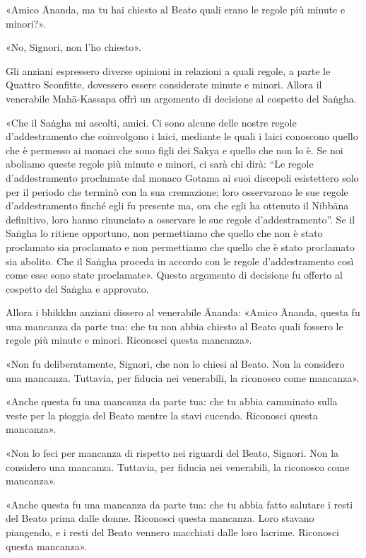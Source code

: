 «Amico Ānanda, ma tu hai chiesto al Beato quali erano le regole più
minute e minori?».


«No, Signori, non l’ho chiesto».


 Gli anziani espressero diverse opinioni in relazioni
a quali regole, a parte le Quattro Sconfitte, dovessero essere
considerate minute e minori. Allora il venerabile Mahā-Kassapa offrì un
argomento di decisione al cospetto del Saṅgha.


 «Che il Saṅgha mi ascolti, amici. Ci sono alcune delle
nostre regole d’addestramento che coinvolgono i laici, mediante le quali
i laici conoscono quello che è permesso ai monaci che sono figli dei
Sakya e quello che non lo è. Se noi aboliamo queste regole più minute e
minori, ci sarà chi dirà: “Le regole d’addestramento proclamate dal
monaco Gotama ai suoi discepoli esistettero solo per il periodo che
terminò con la sua cremazione; loro osservarono le sue regole
d’addestramento finché egli fu presente ma, ora che egli ha ottenuto il
Nibbāna definitivo, loro hanno rinunciato a osservare le sue regole
d’addestramento”. Se il Saṅgha lo ritiene opportuno, non permettiamo che
quello che non è stato proclamato sia proclamato e non permettiamo che
quello che è stato proclamato sia abolito. Che il Saṅgha proceda in
accordo con le regole d’addestramento così come esse sono state
proclamate». Questo argomento di decisione fu offerto al cospetto del
Saṅgha e approvato.


Allora i bhikkhu anziani dissero al venerabile Ānanda: «Amico Ānanda,
questa fu una mancanza da parte tua: che tu non abbia chiesto al Beato
quali fossero le regole più minute e minori. Riconosci questa mancanza».


«Non fu deliberatamente, Signori, che non lo chiesi al Beato. Non la
considero una mancanza. Tuttavia, per fiducia nei venerabili, la
riconosco come mancanza».


«Anche questa fu una mancanza da parte tua: che tu abbia camminato sulla
veste per la pioggia del Beato mentre la stavi cucendo. Riconosci questa
mancanza».


«Non lo feci per mancanza di rispetto nei riguardi del Beato, Signori.
Non la considero una mancanza. Tuttavia, per fiducia nei venerabili, la
riconosco come mancanza».


«Anche questa fu una mancanza da parte tua: che tu abbia fatto salutare
i resti del Beato prima dalle donne. Riconosci questa mancanza. Loro
stavano piangendo, e i resti del Beato vennero macchiati dalle loro
lacrime. Riconosci questa mancanza».


